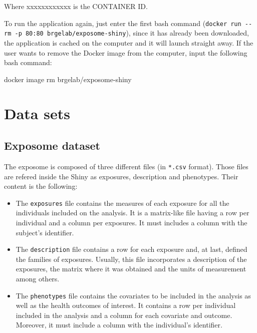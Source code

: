 \documentclass[
]{book}
\newenvironment{Shaded}{\begin{snugshade}}{\end{snugshade}}
\newcommand{\ExtensionTok}[1]{#1}
\newcommand{\NormalTok}[1]{#1}
\providecommand{\tightlist}{%
  \setlength{\itemsep}{0pt}\setlength{\parskip}{0pt}}
\begin{document}
Where xxxxxxxxxxxx is the CONTAINER ID.

To run the application again, just enter the first bash command (\texttt{docker\ run\ -\/-rm\ -p\ 80:80\ brgelab/exposome-shiny}), since it has already been downloaded, the application is cached on the computer and it will launch straight away. If the user wants to remove the Docker image from the computer, input the following bash command:

\begin{Shaded}
\begin{Highlighting}[]
\ExtensionTok{docker}\NormalTok{ image rm brgelab/exposome-shiny}
\end{Highlighting}
\end{Shaded}

\hypertarget{data-sets}{%
\chapter{Data sets}\label{data-sets}}

\hypertarget{exposome-dataset}{%
\section{Exposome dataset}\label{exposome-dataset}}

The exposome is composed of three different files (in \texttt{*.csv} format). Those files are refered inside the Shiny as exposures, description and phenotypes. Their content is the following:

\begin{itemize}
\tightlist
\item
  The \texttt{exposures} file contains the measures of each exposure for all the individuals included on the analysis. It is a matrix-like file having a row per individual and a column per exposures. It must includes a column with the subject's identifier.
\item
  The \texttt{description} file contains a row for each exposure and, at last, defined the families of exposures. Usually, this file incorporates a description of the exposures, the matrix where it was obtained and the units of measurement among others.
\item
  The \texttt{phenotypes} file contains the covariates to be included in the analysis as well as the health outcomes of interest. It contains a row per individual included in the analysis and a column for each covariate and outcome. Moreover, it must include a column with the individual's identifier.
\end{itemize}
\end{document}
